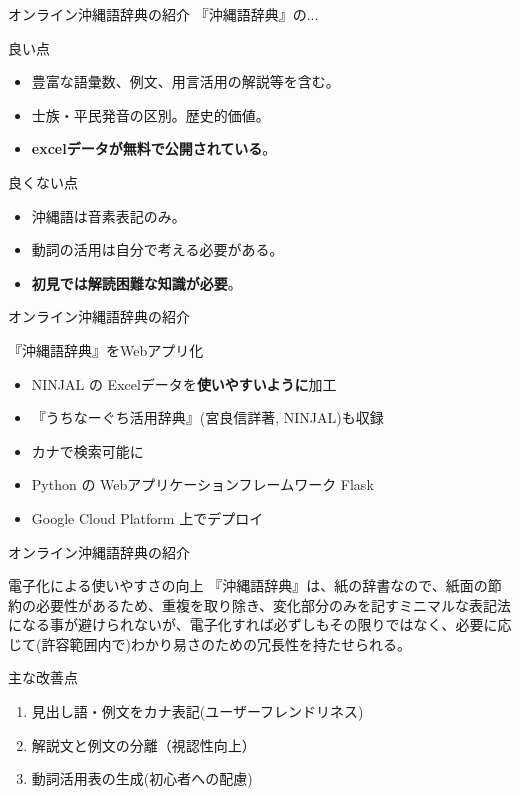 \documentclass[14pt]{beamer}
\begin{document}
\begin{frame}{オンライン沖縄語辞典の紹介}
  『沖縄語辞典』の...
  \begin{block}{良い点}
    \begin{itemize}
    \item 豊富な語彙数、例文、用言活用の解説等を含む。
    \item 士族・平民発音の区別。歴史的価値。
    \item \textbf{excelデータが無料で公開されている}。
    \end{itemize}
  \end{block}
  \begin{block}{良くない点}
    \begin{itemize}
    \item 沖縄語は音素表記のみ。
    \item 動詞の活用は自分で考える必要がある。
    \item \textbf{初見では解読困難な知識が必要}。
    \end{itemize}
  \end{block}
\end{frame}

\begin{frame}{オンライン沖縄語辞典の紹介}
  \begin{block}{『沖縄語辞典』をWebアプリ化}
    \begin{itemize}
    \item NINJAL の Excelデータを\textbf{使いやすいように}加工
    \item 『うちなーぐち活用辞典』(宮良信詳著, NINJAL)も収録
    \item カナで検索可能に
    \item Python の Webアプリケーションフレームワーク Flask
    \item Google Cloud Platform 上でデプロイ
    \end{itemize}
  \end{block}
\end{frame}


\begin{frame}{オンライン沖縄語辞典の紹介}
  \begin{block}{電子化による使いやすさの向上}
    \vspace{0pt}
    『沖縄語辞典』は、紙の辞書なので、紙面の節約の必要性があるため、重複を取り除き、変化部分のみを記すミニマルな表記法になる事が避けられないが、電子化すれば必ずしもその限りではなく、必要に応じて(許容範囲内で)わかり易さのための冗長性を持たせられる。
  \end{block}
  \begin{block}{主な改善点}
    \begin{enumerate}
    \item 見出し語・例文をカナ表記(ユーザーフレンドリネス)
    \item 解説文と例文の分離（視認性向上）
    \item 動詞活用表の生成(初心者への配慮)
    \end{enumerate}
  \end{block}
\end{frame}
\end{document}
